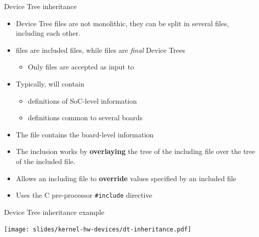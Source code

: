 \begin{frame}[fragile]{Device Tree inheritance}
  \begin{itemize}
  \item Device Tree files are not monolithic, they can be split in
    several files, including each other.
  \item {} files are included files, while  files
    are {\em final} Device Trees
    \begin{itemize}
    \item Only  files are accepted as input to 
    \end{itemize}
  \item Typically,  will contain
    \begin{itemize}
    \item definitions of SoC-level information
    \item definitions common to several boards
    \end{itemize}
  \item The  file contains the board-level information
  \item The inclusion works by {\bf overlaying} the tree of the
    including file over the tree of the included file.
  \item Allows an including file to {\bf override} values specified by
    an included file
  \item Uses the C pre-processor {\tt \#include} directive
  \end{itemize}
\end{frame}

\begin{frame}{Device Tree inheritance example}
  \begin{center}
    \texttt{[image: slides/kernel-hw-devices/dt-inheritance.pdf]}
  \end{center}
\end{frame}

